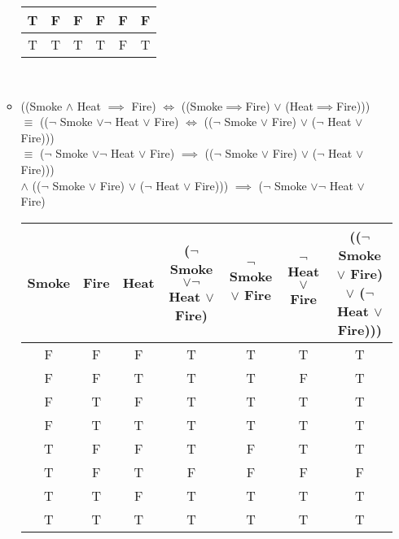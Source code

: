 \documentclass[10.5pt,letterpaper]{article}
\newcommand\tab[1][0.5cm]{\hspace*{#1}}
\begin{document}
\begin{enumerate}[label=\textbf{Problem \arabic*.}]
\begin{itemize}
\begin{tabular} {|c|c|c|c|c|c|}
				\hline
				T & F & F & \cellcolor{green!25}F & F & \cellcolor{green!25}F \\
				\hline
				T & T & T & \cellcolor{green!25}T & F & \cellcolor{green!25}T \\
				\hline
				\end{tabular} \\
				\boxed{\text{This is valid.}}
			\item ((Smoke $\land$ Heat $\implies$ Fire) $\Leftrightarrow$ ((Smoke$\implies$Fire) $\lor$ (Heat$\implies$Fire)))\\
			$\equiv$ (($\neg$ Smoke $\lor \neg$ Heat $\lor$ Fire) $\Leftrightarrow$ (($\neg$ Smoke $\lor$ Fire) $\lor$ ($\neg$ Heat $\lor$ Fire)))\\
			$\equiv$ ($\neg$ Smoke $\lor \neg$ Heat $\lor$ Fire) $\implies$ (($\neg$ Smoke $\lor$ Fire) $\lor$ ($\neg$ Heat $\lor$ Fire))) \\
			\tab $\land$ (($\neg$ Smoke $\lor$ Fire) $\lor$ ($\neg$ Heat $\lor$ Fire))) $\implies$ ($\neg$ Smoke $\lor \neg$ Heat $\lor$ Fire) \\ 
				\hspace*{-4cm}\begin{tabular} {|c|c|c|c|c|c|c|}
				\hline
				Smoke & Fire & Heat& ($\neg$ Smoke $\lor \neg$ Heat $\lor$ Fire) & $\neg$ Smoke $\lor$ Fire & $\neg$ Heat $\lor$ Fire & (($\neg$ Smoke $\lor$ Fire) $\lor$ ($\neg$ Heat $\lor$ Fire)))\\
				\hline
				F & F & F & \cellcolor{green!25}T & T & T & \cellcolor{green!25}T\\
				\hline
				F & F & T & \cellcolor{green!25}T & T & F & \cellcolor{green!25}T\\
				\hline
				F & T & F & \cellcolor{green!25}T & T & T & \cellcolor{green!25}T\\
				\hline
				F & T & T & \cellcolor{green!25}T & T & T & \cellcolor{green!25}T\\
				\hline
				T & F & F & \cellcolor{green!25}T & F & T & \cellcolor{green!25}T\\
				\hline
				T & F & T & \cellcolor{green!25}F & F & F & \cellcolor{green!25}F\\
				\hline
				T & T & F & \cellcolor{green!25}T & T & T & \cellcolor{green!25}T\\
				\hline
				T & T & T & \cellcolor{green!25}T & T & T & \cellcolor{green!25}T\\
				\hline
				\end{tabular} \\

\end{itemize}
\end{enumerate}
\end{document}
